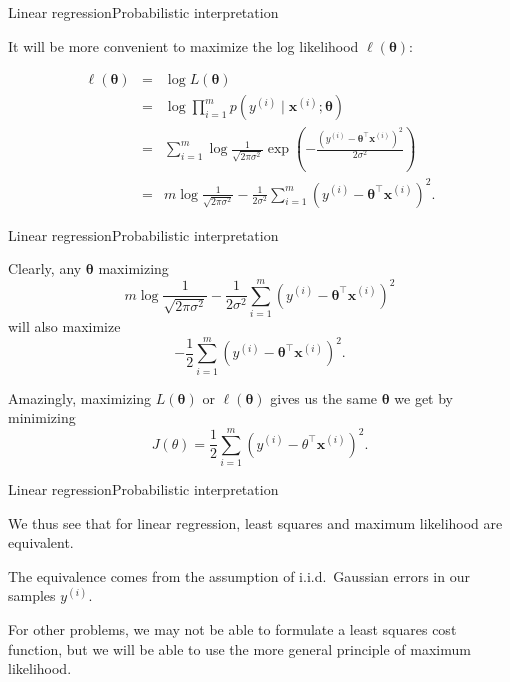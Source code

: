 \documentclass{beamer}
\renewcommand{\vec}[1]{\boldsymbol{#1}}
\begin{document}
\begin{frame}{Linear regression}{Probabilistic interpretation}

  It will be more convenient to maximize the
  \alert{log likelihood} $\ell(\vec{\theta})$:

  \begin{eqnarray}
    \ell(\vec{\theta}) & = & \log L(\vec{\theta}) \nonumber \\
    & = & \log \prod_{i=1}^m p(y^{(i)} \mid \vec{x}^{(i)} ; \vec{\theta}) \\
    & = & \sum_{i=1}^m \log \frac{1}{\sqrt{2\pi\sigma^2}}\exp{\left( - \frac{(y^{(i)} - \vec{\theta}^\top \vec{x}^{(i)})^2}{2\sigma^2}\right)} \nonumber \\
    & = & m \log \frac{1}{\sqrt{2\pi\sigma^2}} - \frac{1}{2\sigma^2}\sum_{i=1}^m(y^{(i)} - \vec{\theta}^\top\vec{x}^{(i)})^2. \nonumber
  \end{eqnarray}

\end{frame}


\begin{frame}{Linear regression}{Probabilistic interpretation}

  Clearly, any $\vec{\theta}$ maximizing
  \[ m \log \frac{1}{\sqrt{2\pi\sigma^2}} - \frac{1}{2\sigma^2}\sum_{i=1}^m(y^{(i)} - \vec{\theta}^\top\vec{x}^{(i)})^2 \]
  will also maximize
  \[ - \frac{1}{2}\sum_{i=1}^m(y^{(i)} - \vec{\theta}^\top\vec{x}^{(i)})^2 .\]

  \bigskip

  Amazingly, maximizing $L(\vec{\theta})$ or $\ell(\vec{\theta})$
  gives us the same $\vec{\theta}$ we get by minimizing
  \[ J(\theta) = \frac{1}{2}\sum_{i=1}^m(y^{(i)}-\theta^\top\vec{x}^{(i)})^2 .\]

\end{frame}


\begin{frame}{Linear regression}{Probabilistic interpretation}

  We thus see that for linear regression, \alert{least squares and
    maximum likelihood are equivalent}.

  \medskip

  The equivalence comes from the assumption of i.i.d.\ Gaussian errors
  in our samples $y^{(i)}$.
  
  \medskip

  For other problems, we may not be able to formulate a least squares
  cost function, but we will be able to use the more general principle of
  maximum likelihood.

\end{frame}
\end{document}
